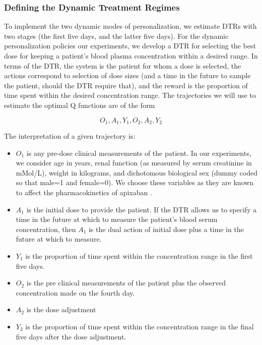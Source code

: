 \subsubsection{Defining the Dynamic Treatment Regimes}

To implement the two dynamic modes of personalization, we estimate DTRs with two stages (the first five days, and the latter five days).  For the dynamic personalization policies our experiments, we develop a DTR for selecting the best dose for keeping a patient’s blood plasma concentration within a desired range.  In terms of the DTR, the system is the patient for whom a dose is selected, the actions correspond to selection of dose sizes (and a time in the future to sample the patient, should the DTR require that), and the reward is the proportion of time spent within the desired concentration range. The trajectories we will use to estimate the optimal Q functions are of the form

\begin{equation}\label{key}
O_1, A_1, Y_1, O_2, A_2, Y_2
\end{equation}

\noindent The interpretation of a given trajectory is:
\begin{itemize}
	\item $ O_1 $ is any pre-dose clinical measurements of the patient.  In our experiments, we consider age in years, renal function (as measured by serum creatinine in mMol/L), weight in kilograms, and dichotomous biological sex (dummy coded so that male=1 and female=0).  We choose these variables as they are known to affect the pharmacokinetics of apixaban \cite{byon2019apixaban}.  
	\item $ A_1 $ is the initial dose to provide the patient.  If the DTR allows us to specify a time in the future at which to measure the patient’s blood serum concentration, then $A_1$ is the dual action of initial dose plus a time in the future at which to measure.
	\item $ Y_1 $ is the proportion of time spent within the concentration range in the first five days.
	\item $ O_2 $ is the pre clinical measurements of the patient plus the observed concentration made on the fourth day.
	\item $ A_2 $ is the dose adjustment
	\item $ Y_2 $ is the proportion of time spent within the concentration range in the final five days after the dose adjustment.
\end{itemize}

